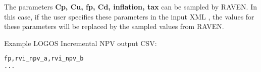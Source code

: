 The parameters \textbf{Cp, Cu, fp, Cd, inflation, tax} can be sampled by RAVEN. In
this case, if the user specifies these parameters in the input XML ,
the values for these parameters will be replaced by the sampled values from RAVEN.

Example LOGOS Incremental NPV output CSV:
\begin{lstlisting}[language=python]
fp,rvi_npv_a,rvi_npv_b
...
\end{lstlisting}
